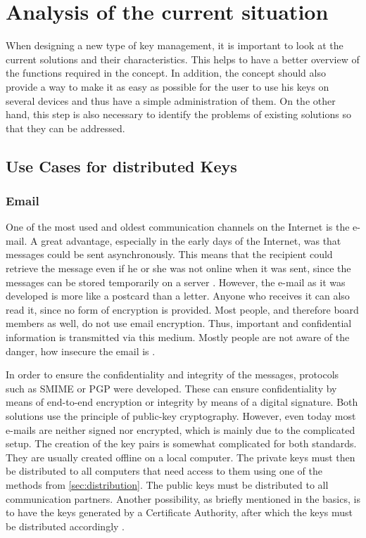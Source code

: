\documentclass[12pt,oneside,a4paper,parskip]{scrbook}
\begin{document}
\chapter{Analysis of the current situation}

When designing a new type of key management, it is important to look at the current solutions and their characteristics. This helps to have a better overview of the functions required in the concept. In addition, the concept should also provide a way to make it as easy as possible for the user to use his keys on several devices and thus have a simple administration of them. On the other hand, this step is also necessary to identify the problems of existing solutions so that they can be addressed.

\section{Use Cases for distributed Keys}

\subsection{Email}
One of the most used and oldest communication channels on the Internet is the e-mail. A great advantage, especially in the early days of the Internet, was that messages could be sent asynchronously. This means that the recipient could retrieve the message even if he or she was not online when it was sent, since the messages can be stored temporarily on a server \parencite{van_vleck_electronic_2012}. \newline
However, the e-mail as it was developed is more like a postcard than a letter. Anyone who receives it can also read it, since no form of encryption is provided. Most people, and therefore board members as well, do not use email encryption. Thus, important and confidential information is transmitted via this medium. Mostly people are not aware of the danger, how insecure the email is \parencite{managers_mail_2019}. \newline

In order to ensure the confidentiality and integrity of the messages, protocols such as SMIME or PGP were developed. These can ensure confidentiality by means of end-to-end encryption or integrity by means of a digital signature. Both solutions use the principle of public-key cryptography. However, even today most e-mails are neither signed nor encrypted, which is mainly due to the complicated setup. The creation of the key pairs is somewhat complicated for both standards. They are usually created offline on a local computer. The private keys must then be distributed to all computers that need access to them using one of the methods from \ref{sec:distribution}. The public keys must be distributed to all communication partners. Another possibility, as briefly mentioned in the basics, is to have the keys generated by a Certificate Authority, after which the keys must be distributed accordingly \parencite{kirsch_2001}.
\end{document}

